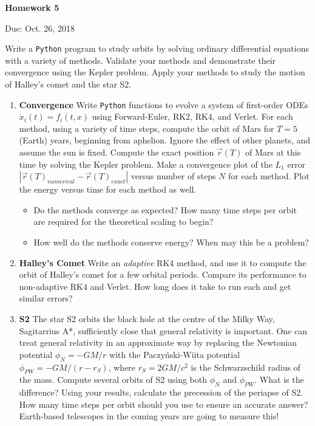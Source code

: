 \documentclass{article}
\newcommand{\Python}{{\texttt{Python}}}
\begin{document}
\begin{center}

\vspace*{-2.5cm}
\LARGE
\bf{Homework 5}
\vspace{1cm}

\large{Due: Oct. 26, 2018}
\vspace{1cm}

\end{center}

Write a \Python{} program to study orbits by solving ordinary differential equations with a variety of methods. Validate your methods and demonstrate their convergence using the Kepler problem. Apply your methods to study the motion of Halley's comet and the star S2.

\begin{enumerate}
	\item {\bf Convergence} 
		Write \Python{} functions to evolve a system of first-order ODEs $\dot{x}_i(t) = f_i(t, x)$ using Forward-Euler, RK2, RK4, and Verlet.  For each method, using a variety of time steps, compute the orbit of Mars for $T=5$ (Earth) years, beginning from aphelion.  Ignore the effect of other planets, and assume the sun is fixed.  Compute the exact position $\vec{r}(T)$ of Mars at this time by solving the Kepler problem. Make a convergence plot of the $L_1$ error $|\vec{r}(T)_{numerical} - \vec{r}(T)_{exact}|$ versus number of steps $N$ for each method.  Plot the energy versus time for each method as well.  
		\begin{itemize}
			\item Do the methods converge as expected?  How many time steps per orbit are required for the theoretical scaling to begin?
			\item How well do the methods conserve energy?  When may this be a problem?
		\end{itemize}
	\item {\bf Halley's Comet} 
		Write an \emph{adaptive} RK4 method, and use it to compute the orbit of Halley's comet for a few orbital periods. Compare its performance to non-adaptive RK4 and Verlet.  How long does it take to run each and get similar errors?
	\item {\bf S2} 
		The star S2 orbits the black hole at the centre of the Milky Way, Sagitarrius A*, sufficiently close that general relativity is important.  One can treat general relativity in an approximate way by replacing the Newtonian potential $\phi_N = -GM/r$ with the Paczy\'{n}ski-Wiita potential $\phi_{PW} = -GM / (r-r_S)$, where $r_S = 2GM/c^2$ is the Schwarzschild radius of the mass.  Compute several orbits of S2 using both $\phi_N$ and $\phi_{PW}$.  What is the difference?  Using your results, calculate the precession of the periapse of S2.  How many time steps per orbit should you use to ensure an accurate answer?  Earth-based telescopes in the coming years are going to measure this!
\end{enumerate}
\end{document}

